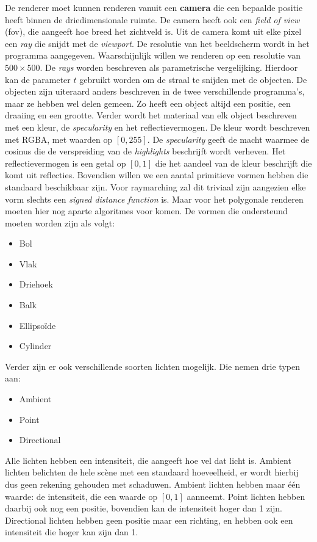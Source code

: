 \documentclass[12pt, a4paper]{article}
\begin{document}
De renderer moet kunnen renderen vanuit een \textbf{camera} die een bepaalde positie heeft binnen de driedimensionale ruimte. De camera heeft ook een \emph{field of view} (fov), die aangeeft hoe breed het zichtveld is. Uit de camera komt uit elke pixel een \emph{ray} die snijdt met de \emph{viewport}. De resolutie van het beeldscherm wordt in het programma aangegeven. Waarschijnlijk willen we renderen op een resolutie van \(500\times 500\). De \emph{rays} worden beschreven als parametrische vergelijking. Hierdoor kan de parameter \(t\) gebruikt worden om de straal te snijden met de objecten. De objecten zijn uiteraard anders beschreven in de twee verschillende programma's, maar ze hebben wel delen gemeen. Zo heeft een object altijd een positie, een draaiing en een grootte. Verder wordt het materiaal van elk object beschreven met een kleur, de \emph{specularity} en het reflectievermogen. De kleur wordt beschreven met RGBA, met waarden op \([0, 255]\). De \emph{specularity} geeft de macht waarmee de cosinus die de verspreiding van de \emph{highlights} beschrijft wordt verheven. Het reflectievermogen is een getal op \([0, 1]\) die het aandeel van de kleur beschrijft die komt uit reflecties. Bovendien willen we een aantal primitieve vormen hebben die standaard beschikbaar zijn. Voor raymarching zal dit triviaal zijn aangezien elke vorm slechts een \emph{signed distance function} is. Maar voor het polygonale renderen moeten hier nog aparte algoritmes voor komen. De vormen die ondersteund moeten worden zijn als volgt:
\begin{itemize}
	\item Bol
	\item Vlak
	\item Driehoek
	\item Balk
	\item Ellipsoïde
	\item Cylinder
\end{itemize}

Verder zijn er ook verschillende soorten lichten mogelijk. Die nemen drie typen aan:
\begin{itemize}
	\item Ambient
	\item Point
	\item Directional
\end{itemize}
Alle lichten hebben een intensiteit, die aangeeft hoe vel dat licht is. Ambient lichten belichten de hele scène met een standaard hoeveelheid, er wordt hierbij dus geen rekening gehouden met schaduwen. Ambient lichten hebben maar één waarde: de intensiteit, die een waarde op \([0, 1]\) aanneemt. Point lichten hebben daarbij ook nog een positie, bovendien kan de intensiteit hoger dan 1 zijn. Directional lichten hebben geen positie maar een richting, en hebben ook een intensiteit die hoger kan zijn dan 1.
\end{document}
